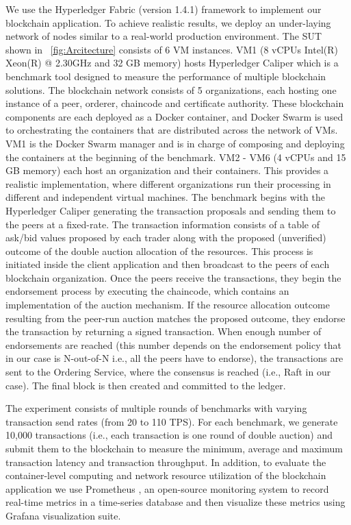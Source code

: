 We use the Hyperledger Fabric (version 1.4.1) framework to implement our blockchain application. To achieve realistic results, we deploy an under-laying network of nodes similar to a real-world production environment. The \ac{SUT} shown in \figureautorefname~\ref{fig:Arcitecture} consists of 6 \ac{VM} instances. \ac{VM}1 (8 \acp{vCPU} Intel(R) Xeon(R) @ 2.30GHz and 32 GB memory) hosts Hyperledger Caliper \cite{caliper} which is a benchmark tool designed to measure the performance of multiple blockchain solutions. The blockchain network consists of 5 organizations, each hosting one instance of a peer, orderer, chaincode and certificate authority. These blockchain components are each deployed as a Docker container, and Docker Swarm is used to orchestrating the containers that are distributed across the network of \acp{VM}. \ac{VM}1 is the Docker Swarm manager and is in charge of composing and deploying the containers at the beginning of the benchmark. \ac{VM}2 - \ac{VM}6 (4 \acp{vCPU} and 15 GB memory) each host an organization and their containers. This provides a realistic implementation, where different organizations run their processing in different and independent virtual machines. The benchmark begins with the Hyperledger Caliper generating the transaction proposals and sending them to the peers at a fixed-rate. The transaction information consists of a table of ask/bid values proposed by each trader along with the proposed (unverified) outcome of the double auction allocation of the resources. This process is initiated inside the client application and then broadcast to the peers of each blockchain organization. Once the peers receive the transactions, they begin the endorsement process by executing the chaincode, which contains an implementation of the auction mechanism. If the resource allocation outcome resulting from the peer-run auction matches the proposed outcome, they endorse the transaction by returning a signed transaction. When enough number of endorsements are reached (this number depends on the endorsement policy that in our case is N-out-of-N i.e., all the peers have to endorse), the transactions are sent to the Ordering Service, where the consensus is reached (i.e., Raft in our case). The final block is then created and committed to the ledger.



The experiment consists of multiple rounds of benchmarks with varying transaction send rates (from 20 to 110 \ac{TPS}). For each benchmark, we generate 10,000 transactions (i.e., each transaction is one round of double auction) and submit them to the blockchain to measure the minimum, average and maximum transaction latency and transaction throughput. In addition, to evaluate the container-level computing and network resource utilization of the blockchain application we use Prometheus \cite{prometheus}, an open-source monitoring system to record real-time metrics in a time-series database and then visualize these metrics using Grafana \cite{grafana} visualization suite.


